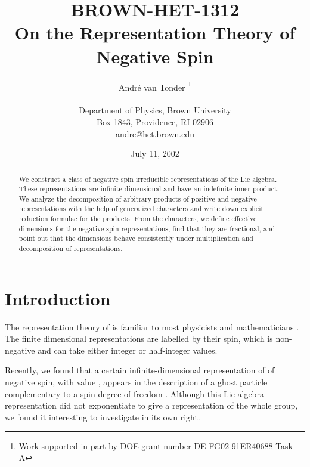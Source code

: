 \documentclass[a4paper,dvips,12pt]{article}
\providecommand {\half} {{1 \over 2}}
\begin{document}
    \title{{\footnotesize{\hfill BROWN-HET-1312}}
            \\On the Representation Theory of Negative Spin}
    \author{Andr\'e van Tonder
            \thanks{Work supported in part by DOE grant number DE FG02-91ER40688-Task A}
            \\ \\
            Department of Physics, Brown University \\
            Box 1843, Providence, RI 02906 \\
            andre@het.brown.edu}
    \date{July 11, 2002}

    \maketitle

    \begin{abstract}
        We construct a class of negative spin irreducible representations
        of the \coordHE{} Lie algebra.  These representations are
        infinite-dimensional and have an indefinite inner product.
        We analyze the decomposition of arbitrary
        products of positive and negative representations with the help of
        generalized characters and write down explicit
        reduction formulae for the products.
        From the characters, we define effective dimensions for
        the negative spin representations, find that they are
        fractional, and point out that the dimensions behave
        consistently under multiplication and decomposition of
        representations.
    \end{abstract}


    \section{Introduction}

    The representation theory of \coordHE{} is
    familiar to most physicists and mathematicians \cite{ELLIOTT}.  The
    finite dimensional representations are labelled by
    their spin, which is non-negative and can take either integer or
    half-integer values.

    Recently, we found that a certain infinite-dimensional
    representation of \coordHE{} of negative spin,
    with value \myHighlight{$-\half$}\coordHE{}, appears in the description of
    a ghost particle
    complementary to a spin \myHighlight{$\half$}\coordHE{} degree of freedom
    \cite{MYSELF}.
    Although this Lie algebra
    representation did not exponentiate to give a
    representation of the whole \coordHE{} group, we found it
    interesting to investigate in
    its own right.
\end{document}
